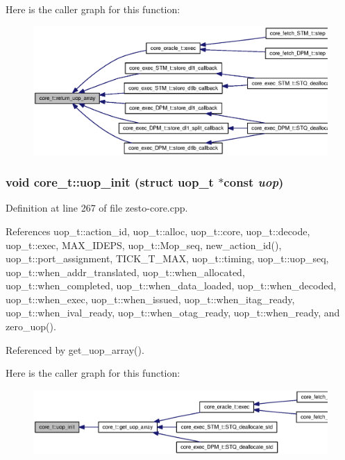 Here is the caller graph for this function:\nopagebreak
\begin{figure}[H]
\begin{center}
\leavevmode
\includegraphics[width=319pt]{classcore__t_466dcf5a0ecb9fd32ad557561286dfc9_icgraph}
\end{center}
\end{figure}
\subsubsection[{uop\_\-init}]{\setlength{\rightskip}{0pt plus 5cm}void core\_\-t::uop\_\-init (struct {\bf uop\_\-t} $\ast$const  {\em uop})\hspace{0.3cm}{\tt  [protected]}}\label{classcore__t_9e530ff1e928624b77e18ae6d99fbd28}




Definition at line 267 of file zesto-core.cpp.

References uop\_\-t::action\_\-id, uop\_\-t::alloc, uop\_\-t::core, uop\_\-t::decode, uop\_\-t::exec, MAX\_\-IDEPS, uop\_\-t::Mop\_\-seq, new\_\-action\_\-id(), uop\_\-t::port\_\-assignment, TICK\_\-T\_\-MAX, uop\_\-t::timing, uop\_\-t::uop\_\-seq, uop\_\-t::when\_\-addr\_\-translated, uop\_\-t::when\_\-allocated, uop\_\-t::when\_\-completed, uop\_\-t::when\_\-data\_\-loaded, uop\_\-t::when\_\-decoded, uop\_\-t::when\_\-exec, uop\_\-t::when\_\-issued, uop\_\-t::when\_\-itag\_\-ready, uop\_\-t::when\_\-ival\_\-ready, uop\_\-t::when\_\-otag\_\-ready, uop\_\-t::when\_\-ready, and zero\_\-uop().

Referenced by get\_\-uop\_\-array().

Here is the caller graph for this function:\nopagebreak
\begin{figure}[H]
\begin{center}
\leavevmode
\includegraphics[width=331pt]{classcore__t_9e530ff1e928624b77e18ae6d99fbd28_icgraph}
\end{center}
\end{figure}
